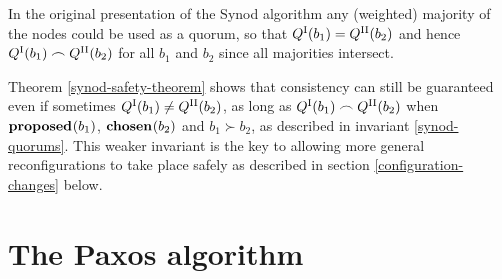 \documentclass[journal]{IEEEtran}
\begin{document}
In the original presentation of the Synod algorithm any (weighted) majority of
the nodes could be used as a quorum, so that ${Q}^\textrm{I}_{}(b_1) = {Q}^\textrm{II}_{}(b_2)$ and
hence ${Q}^\textrm{I}_{}(b_1) \frown {Q}^\textrm{II}_{}(b_2)$ for all $b_1$ and $b_2$ since all
majorities intersect.

Theorem \ref{synod-safety-theorem} shows that consistency can still be
guaranteed even if sometimes ${Q}^\textrm{I}_{}(b_1) \ne {Q}^\textrm{II}_{}(b_2)$, as long as
${Q}^\textrm{I}_{}(b_1) \frown {Q}^\textrm{II}_{}(b_2)$ when $\mathbf{proposed}_{}(b_1)$, $\mathbf{chosen}_{}(b_2)$ and $b_1
\succ b_2$, as described in invariant \ref{synod-quorums}.  This weaker
invariant is the key to allowing more general reconfigurations to take place
safely as described in section \ref{configuration-changes} below.

\section{The Paxos algorithm}\label{paxos-text}
\end{document}
